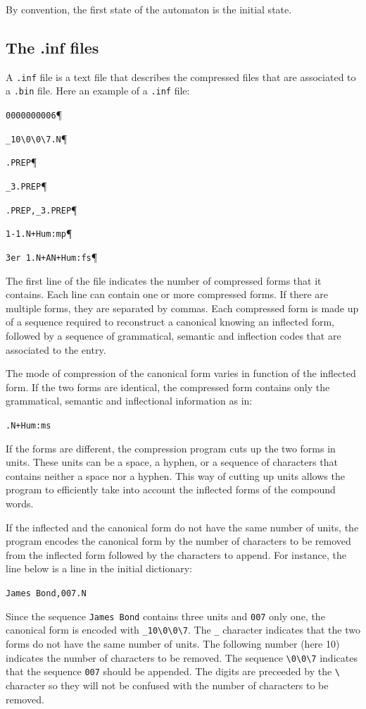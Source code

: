 \bigskip
\noindent By convention, the first state of the automaton is the initial state.

\subsection{The .inf files}
A \verb+.inf+ file is a text file that describes the compressed files that are
associated to a \verb+.bin+ file. Here an example of a \verb+.inf+ file:

\bigskip
\verb$0000000006$\P

\verb$_10\0\0\7.N$\P

\verb$.PREP$\P

\verb$_3.PREP$\P

\verb$.PREP,_3.PREP$\P

\verb$1-1.N+Hum:mp$\P

\verb$3er 1.N+AN+Hum:fs$\P

\bigskip
\noindent The first line of the file indicates the number of compressed forms that
it contains. Each line can contain one or more compressed forms. If there are
multiple forms, they are separated by commas. Each compressed form is made up of
a sequence required to reconstruct a canonical knowing an inflected form,
followed by a sequence of grammatical, semantic and inflection codes that are
associated to the entry.

\bigskip
\noindent The mode of compression of the canonical form varies in function of the
inflected form. If the two forms are identical, the compressed form contains only
the grammatical, semantic and inflectional information as in:

\bigskip
\verb$.N+Hum:ms$

\bigskip
\noindent If the forms are different, the compression program cuts up the two
forms in units. These units can be a space, a hyphen, or a sequence of characters
that contains neither a space nor a hyphen. This way of cutting up units allows
the program to efficiently take into account the inflected forms of the compound
words.

\bigskip
\noindent If the inflected and the canonical form do not have the same number of
units, the program encodes the canonical form by the number of characters to be
removed from the inflected form followed by the characters to append. For
instance, the line below is a line in the initial dictionary:

\bigskip
\verb+James Bond,007.N+

\bigskip
\noindent Since the sequence \verb+James Bond+ contains three units and \verb+007+ only
one, the canonical form is encoded with \verb+_10\0\0\7+. The \verb+_+ character
indicates that the two forms do not have the same number of units. The following
number (here 10) indicates the number of characters to be removed. The sequence
\verb+\0\0\7+ indicates that the sequence \verb+007+ should be appended. The
digits are preceeded by the \verb+\+ character so they will not be confused with
the number of characters to be removed.

